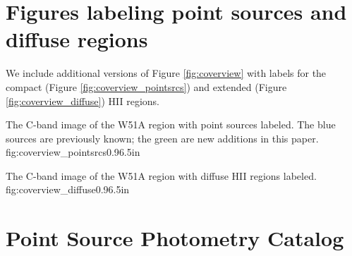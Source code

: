 

\appendix
\section{Figures labeling point sources and diffuse regions}
We include additional versions of Figure \ref{fig:coverview} with labels for
the compact (Figure \ref{fig:coverview_pointsrcs}) and extended (Figure
\ref{fig:coverview_diffuse}) HII regions.

{The C-band image of the W51A region with point sources labeled.  The blue
sources are previously known; the green are new additions in this paper.}
{fig:coverview_pointsrcs}{0.9}{6.5in}

{The C-band image of the W51A region with diffuse HII regions labeled.}
{fig:coverview_diffuse}{0.9}{6.5in}

%

\section{Point Source Photometry Catalog}





